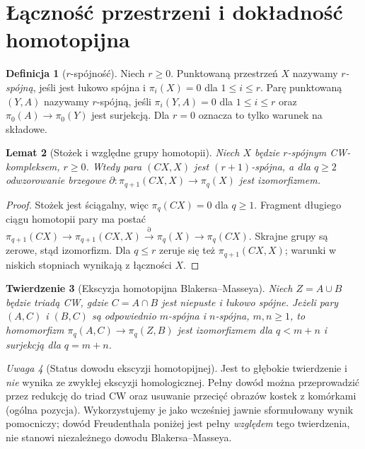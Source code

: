 \documentclass[11pt,a4paper,oneside]{report}
\theoremstyle{plain}
\newtheorem{twierdzenie}{Twierdzenie}[section]
\newtheorem{lemat}[twierdzenie]{Lemat}
\theoremstyle{definition}
\newtheorem{definicja}[twierdzenie]{Definicja}
\theoremstyle{remark}
\newtheorem{uwaga}[twierdzenie]{Uwaga}
\begin{document}
\section{Łączność przestrzeni i dokładność homotopijna}
\begin{definicja}[$r$-spójność]
Niech $r\ge0$. Punktowaną przestrzeń $X$ nazywamy
\emph{$r$-spójną}, jeśli jest łukowo spójna i
$\pi_i(X)=0$ dla $1\le i\le r$.
Parę punktowaną $(Y,A)$ nazywamy $r$-spójną,
jeśli $\pi_i(Y,A)=0$ dla $1\le i\le r$
oraz $\pi_0(A)\to\pi_0(Y)$ jest surjekcją.
Dla $r=0$ oznacza to tylko warunek na składowe.
\end{definicja}

\begin{lemat}[Stożek i względne grupy homotopii]
\label{lem:cone-relative-v8}
Niech $X$ będzie $r$-spójnym CW-kompleksem,
$r\ge0$. Wtedy para $(CX,X)$ jest $(r+1)$-spójna,
a dla $q\ge2$ odwzorowanie brzegowe
$\partial:\pi_{q+1}(CX,X)\to\pi_q(X)$
jest izomorfizmem.
\end{lemat}
\begin{proof}
Stożek jest ściągalny, więc $\pi_q(CX)=0$ dla
$q\ge1$. Fragment długiego ciągu homotopii pary ma postać
$\pi_{q+1}(CX)\to\pi_{q+1}(CX,X)
\xrightarrow{\partial}\pi_q(X)\to\pi_q(CX)$.
Skrajne grupy są zerowe, stąd izomorfizm.
Dla $q\le r$ zeruje się też $\pi_{q+1}(CX,X)$;
warunki w niskich stopniach wynikają z łączności $X$.
\end{proof}

\begin{twierdzenie}[Ekscyzja homotopijna Blakersa--Masseya]
\label{thm:bm-v8}
Niech $Z=A\cup B$ będzie triadą CW, gdzie
$C=A\cap B$ jest niepuste i łukowo spójne.
Jeżeli pary $(A,C)$ i $(B,C)$ są odpowiednio
$m$-spójna i $n$-spójna, $m,n\ge1$, to homomorfizm
$\pi_q(A,C)\to\pi_q(Z,B)$ jest izomorfizmem dla
$q<m+n$ i surjekcją dla $q=m+n$.
\end{twierdzenie}
\begin{uwaga}[Status dowodu ekscyzji homotopijnej]
Jest to głębokie twierdzenie i \emph{nie} wynika ze
zwykłej ekscyzji homologicznej. Pełny dowód można
przeprowadzić przez redukcję do triad CW oraz
usuwanie przecięć obrazów kostek z komórkami
(ogólna pozycja). Wykorzystujemy je jako
wcześniej jawnie sformułowany wynik pomocniczy;
dowód Freudenthala poniżej jest pełny \emph{względem}
tego twierdzenia, nie stanowi niezależnego dowodu
Blakersa--Masseya.
\end{uwaga}
\end{document}
